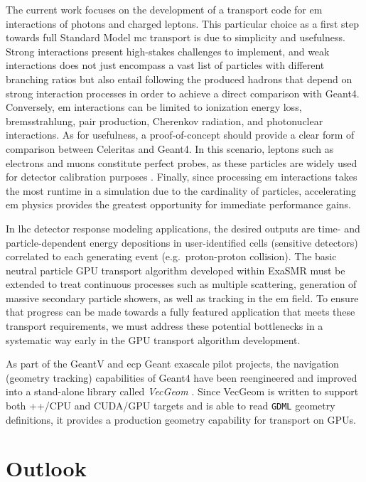 \documentclass[10pt]{article}
\begin{document}
The current work focuses on the development of a transport code for \ac{em}
interactions of photons and charged leptons. This particular choice as a first
step towards full Standard Model \ac{mc} transport is due to simplicity and
usefulness. Strong interactions present high-stakes challenges to implement, and
weak interactions does not just encompass a vast list of particles with
different branching ratios but also entail following the produced hadrons that
depend on strong interaction processes in order to achieve a direct comparison
with Geant4. Conversely, \ac{em} interactions can be limited to ionization
energy loss, bremsstrahlung, pair production, Cherenkov radiation, and
photonuclear interactions. As for usefulness, a proof-of-concept should provide
a clear form of comparison between Celeritas and Geant4. In this scenario,
leptons such as electrons and muons constitute perfect probes, as these
particles are widely used for detector calibration purposes
\cite{atlas_calibration_e,atlas_calibration_mu}.
Finally, since processing \ac{em}
interactions takes the most runtime in a simulation due to the cardinality of particles, accelerating \ac{em} physics provides the greatest opportunity for immediate performance gains.

In \ac{lhc} detector response modeling applications, the desired outputs are
time- and particle-dependent energy depositions in user-identified cells
(sensitive detectors) correlated to each generating event (e.g.~proton-proton
collision). The basic neutral particle GPU transport algorithm developed within
ExaSMR must be extended to treat continuous processes such as multiple
scattering, generation of massive secondary particle showers, as well as
tracking in the \ac{em} field. To ensure that progress can be made
towards a fully featured application that meets these transport requirements, we
must address these potential bottlenecks in a systematic way early in the GPU
transport algorithm development.

As part of the GeantV and \ac{ecp} Geant exascale pilot projects, the navigation
(geometry tracking) capabilities of Geant4 have been reengineered and improved
into a stand-alone library called \emph{VecGeom}
\cite{apostolakis_towards_2015}. Since VecGeom is written to support both
\C++/CPU and CUDA/GPU targets and is able to read \texttt{GDML} geometry
definitions, it provides a production geometry capability for transport on GPUs.

\section*{Outlook}
\end{document}
